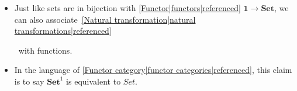 
\begin{itemize}
    \item  Just like sets are in bijection with \ref{Functor|functors|referenced} $\mathbf{1}\rightarrow\mathbf{Set}$, we can also associate \,\ref{Natural transformation|natural transformations|referenced} \, with functions.
    \item In the language of \ref{Functor category|functor categories|referenced}, this claim is to say $\mathbf{Set}^1$ is equivalent to $Set$.
  \end{itemize}
